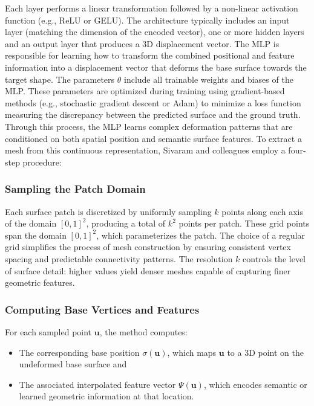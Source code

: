 Each layer performs a linear transformation followed by a non-linear activation function (e.g., ReLU or GELU). 
The architecture typically includes an input layer (matching the dimension of the encoded vector), one or more hidden layers and an output layer that produces a 3D displacement vector. 
The MLP is responsible for learning how to transform the combined positional and feature information into a displacement vector that deforms the base surface towards the target shape. 
The parameters $\theta$ include all trainable weights and biases of the MLP. 
These parameters are optimized during training using gradient-based methods (e.g., stochastic gradient descent or Adam) to minimize a loss function measuring the discrepancy between the predicted surface and the ground truth. 
Through this process, the MLP learns complex deformation patterns that are conditioned on both spatial position and semantic surface features. 
To extract a mesh from this continuous representation, Sivaram and colleagues employ a four-step procedure: 

\subsubsection{Sampling the Patch Domain}

Each surface patch is discretized by uniformly sampling \(k\) points along each axis of the domain \([0,1]^2\), producing a total of \(k^2\) points per patch.
These grid points span the domain $[0,1]^2$, which parameterizes the patch. 
The choice of a regular grid simplifies the process of mesh construction by ensuring consistent vertex spacing and predictable connectivity patterns. 
The resolution $k$ controls the level of surface detail: higher values yield denser meshes capable of capturing finer geometric features. 

\subsubsection{Computing Base Vertices and Features}

For each sampled point $\mathbf{u}$, the method computes: 
\begin{itemize}
  \item The corresponding base position $\sigma(\mathbf{u})$, which maps $\mathbf{u}$ to a 3D point on the undeformed base surface and 
  \item The associated interpolated feature vector $\Psi(\mathbf{u})$, which encodes semantic or learned geometric information at that location.
\end{itemize}

